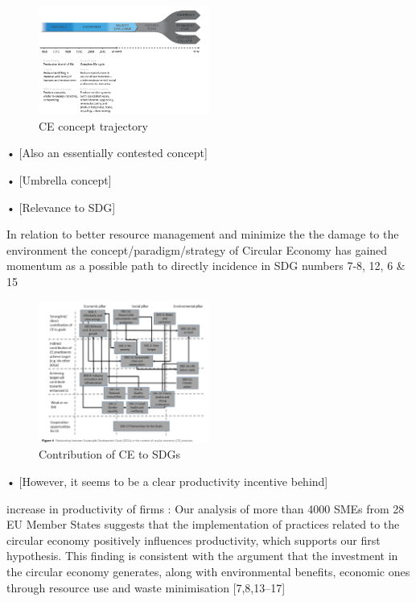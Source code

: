 \begin{figure}[h!]
    \centering
    \includegraphics[width=0.5\textwidth]{sections/asset/ce_fork.PNG}
    \caption{CE concept trajectory}
    \label{fig:ce_path}
\end{figure}





•	[Also an essentially contested concept] \par
\parencite{Korhonen2018}

•	[Umbrella concept] \par

\parencite{Homrich2018}

•	[Relevance to SDG] \par

In relation to better resource management and minimize the the damage to the environment the concept/paradigm/strategy of Circular Economy has gained momentum as a possible path to directly incidence in SDG numbers 7-8, 12, 6 \& 15 
\parencite{Schroeder2018}

\begin{figure}[h!]
    \centering
    \includegraphics[width=0.5\textwidth]{sections/asset/ce_relation.PNG}
    \caption{Contribution of CE to SDGs}
    \label{fig:sustainable_conflicts}
\end{figure}


•	[However, it seems to be a clear productivity incentive behind] \par
increase in productivity of firms \parencite{Moric2020}:
Our analysis of more than 4000 SMEs from 28 EU Member States suggests that the implementation
of practices related to the circular economy positively influences productivity, which supports our first hypothesis. This finding is consistent with the argument that the investment in the circular economy generates, along with environmental benefits, economic ones through resource use and waste minimisation [7,8,13–17]


